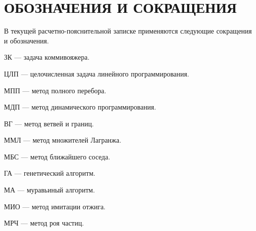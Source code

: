 \chapter*{ОБОЗНАЧЕНИЯ И СОКРАЩЕНИЯ}

В текущей расчетно-пояснительной записке применяются следующие сокращения и обозначения.

ЗК --- задача коммивояжера.

ЦЛП --- целочисленная задача линейного программирования.

МПП --- метод полного перебора.

МДП --- метод динамического программирования.

ВГ --- метод ветвей и границ.

ММЛ --- метод множителей Лагранжа.

МБС --- метод ближайшего соседа.

ГА --- генетический алгоритм.

МА --- муравьиный алгоритм.

МИО --- метод имитации отжига.

МРЧ --- метод роя частиц.